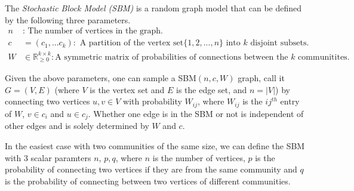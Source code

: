 \begin{definition}The \textit{Stochastic Block Model (SBM)} is a random graph model that can be defined by the following three parameters.
\begin{align*}
    n & : \text{ The number of vertices in the graph. }\\
    c & =(c_1, ...c_k): \text{ A partition of the vertex set} \{1,2, ...,n\} \text{ into } k \text{ disjoint subsets. }\\
    W & \in \mathbb{R}^{k \times k}_{\geq 0}: \text{A symmetric matrix of probabilities of connections between the } k \text{ communitites.}
\end{align*}

Given the above parameters, one can sample a SBM$(n, c, W)$ graph, call it $G = (V, E)$ (where $V$ is the vertex set and $E$ is the edge set, and $n= |V|$) by connecting two vertices $u, v \in V$ with probability $W_{ij}$, where $W_{ij}$ is the $ij^{th}$ entry of $W$, $v \in c_i$ and $u \in c_j$.  Whether one edge is in the SBM or not is independent of other edges and is solely determined by $W$ and $c$.  
\end{definition}

In the easiest case with two communities of the same size, we can define the SBM with 3 scalar paramters $n$, $p, q$, where $n$ is the number of vertices, $p$ is the probability of connecting two vertices if they are from the same community and $q$ is the probability of connecting between two vertices of different communities. 


